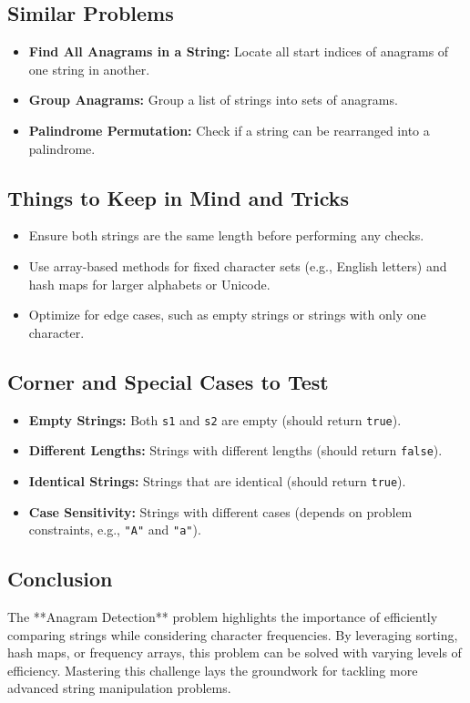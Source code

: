 \subsection*{Similar Problems}
\begin{itemize}
    \item \textbf{Find All Anagrams in a String:} Locate all start indices of anagrams of one string in another.
    \item \textbf{Group Anagrams:} Group a list of strings into sets of anagrams.
    \item \textbf{Palindrome Permutation:} Check if a string can be rearranged into a palindrome.
\end{itemize}

\subsection*{Things to Keep in Mind and Tricks}
\begin{itemize}
    \item Ensure both strings are the same length before performing any checks.
    \item Use array-based methods for fixed character sets (e.g., English letters) and hash maps for larger alphabets or Unicode.
    \item Optimize for edge cases, such as empty strings or strings with only one character.
\end{itemize}

\subsection*{Corner and Special Cases to Test}
\begin{itemize}
    \item \textbf{Empty Strings:} Both \texttt{s1} and \texttt{s2} are empty (should return \texttt{true}).
    \item \textbf{Different Lengths:} Strings with different lengths (should return \texttt{false}).
    \item \textbf{Identical Strings:} Strings that are identical (should return \texttt{true}).
    \item \textbf{Case Sensitivity:} Strings with different cases (depends on problem constraints, e.g., \texttt{"A"} and \texttt{"a"}).
\end{itemize}

\subsection*{Conclusion}
The **Anagram Detection** problem highlights the importance of efficiently comparing strings while considering character frequencies. By leveraging sorting, hash maps, or frequency arrays, this problem can be solved with varying levels of efficiency. Mastering this challenge lays the groundwork for tackling more advanced string manipulation problems.
